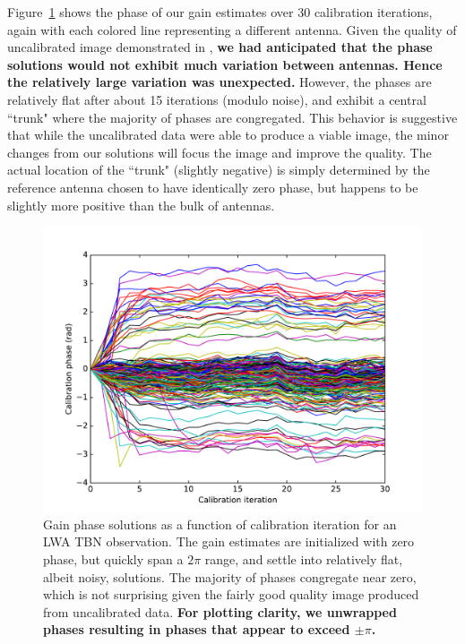 \documentclass[a4paper,fleqn,usenatbib]{../mnras}
\begin{document}
Figure~\ref{fig:data_phase} shows the phase of our gain estimates over 30 calibration 
iterations, again with each colored line representing a different antenna. Given the quality of 
uncalibrated image demonstrated in \cite{thy15c}, \textbf{we had anticipated that the phase
solutions would not exhibit much variation between antennas. Hence the relatively large variation was unexpected.}
However, the phases are relatively flat after about 15 iterations 
(modulo noise), and exhibit a central ``trunk" where the majority of phases are congregated. 
This behavior is suggestive that while the uncalibrated data were able to produce a viable 
image, the minor changes from our solutions will focus the image and improve the quality. The 
actual location of the ``trunk" (slightly negative) is simply determined by the reference antenna 
chosen to have identically zero phase, but happens to be slightly more positive than the bulk of 
antennas. 

\begin{figure}
\begin{center}
\includegraphics[width=\columnwidth]{fig7.pdf}
\caption{Gain phase solutions as a function of calibration iteration for an LWA TBN observation. 
The gain estimates are initialized with zero phase, but quickly span a $2\pi$ range, and settle 
into relatively flat, albeit noisy, solutions. The majority of phases congregate near zero, which is 
not surprising given the fairly good quality image produced from uncalibrated data.
\textbf{For plotting clarity, we unwrapped phases resulting in phases that appear to exceed 
$\pm \pi$.}
}
\label{fig:data_phase}
\end{center}
\end{figure}
\end{document}
